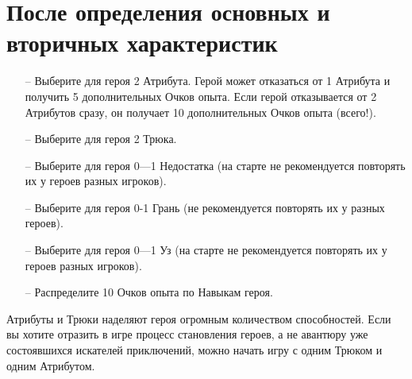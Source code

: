 \section{После определения основных и вторичных характеристик}
\begin{itemize}
\item[--] Выберите для героя 2 Атрибута. Герой может отказаться от 1 Атрибута и получить 5 дополнительных Очков опыта. Если герой отказывается от 2 Атрибутов сразу, он получает 10 дополнительных Очков опыта (всего!).
\item[--] Выберите для героя 2 Трюка.
\item[--] Выберите для героя 0—1 Недостатка (на старте не рекомендуется повторять их у героев разных игроков).
\item[--] Выберите для героя 0-1 Грань (не рекомендуется повторять их у разных героев).
\item[--] Выберите для героя 0—1 Уз (на старте не рекомендуется повторять их у героев разных игроков).
\item[--] Распределите 10 Очков опыта по Навыкам героя.
\end{itemize}
\begin{tcolorbox}
Атрибуты и Трюки наделяют героя огромным количеством способностей. Если вы хотите отразить в игре процесс становления героев, а не авантюру уже состоявшихся искателей приключений, можно начать игру с одним Трюком и одним Атрибутом.
\end{tcolorbox}

%


\earlyEnd






